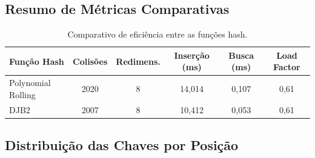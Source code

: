 \documentclass[12pt,a4paper]{abntex2}
\begin{document}
\subsection{Resumo de Métricas Comparativas}
\begin{table}[H]
\centering
\caption{Comparativo de eficiência entre as funções hash.}
\begin{tabular}{lccccc}
\toprule
\textbf{Função Hash} & \textbf{Colisões} & \textbf{Redimens.} & \textbf{Inserção (ms)} & \textbf{Busca (ms)} & \textbf{Load Factor} \\
\midrule
Polynomial Rolling & 2020 & 8 & 14,014 & 0,107 & 0,61 \\
DJB2 & 2007 & 8 & 10,412 & 0,053 & 0,61 \\
\bottomrule\end{tabular}
\end{table}

\subsection{Distribuição das Chaves por Posição}
\end{document}
